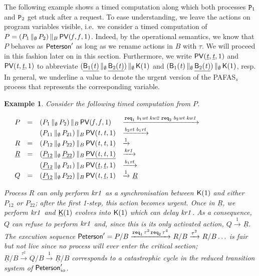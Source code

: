 \documentclass[copyright,creativecommons]{eptcs}
\newenvironment{tracex}{\ccspace{0.15}\noindent}{\ccspace{0.2}}
\newcommand{\ccspace}[1]{\vspace{#1cm}}
\newtheorem{example}[theorem]{Example}
\newcommand{\nar}[2]{\xrightarrow{#1}_{#2}}
\newcommand{\sar}[1]{\nar{#1}{}}
\newcommand{\fa}{\mathit{f}}
\newcommand{\tr}{\mathit{t}}
\newcommand{\Bv}{{\sf B}}
\newcommand{\rtb}[1]{{\it b_{{\rm #1}}rt}}
\newcommand{\wtb}[1]{{\it b_{{\rm #1}}wt}}
\newcommand{\Kv}{{\sf K}}
\newcommand{\rk}[1]{{\it kr #1}}
\newcommand{\wk}[1]{{\it kw #1}}
\newcommand{\vp}{{\sf PV}}
\newcommand{\req}{{\tt req}}
\newcommand{\petersona}{{\sf Peterson}} \newcommand{\petersonb}{\petersona}
\newcommand{\proc}{{\tt P}}
\newcommand{\ppath}[5]{#1 & #2 & #3 & #4 & #5}
\begin{document}
The following example shows a timed computation along which both processes
$\proc_1$ and $\proc_2$ get stuck after a request. To ease understanding,
we leave the actions on program variables visible, i.e.\ we consider a
timed computation of $P = (P_1 \,\|_{\emptyset}\, P_2)
\,\|_B\,\vp(\fa,\fa,1)$. Indeed, by the operational semantics, we know that
$P$ behaves as $\petersona'$ as long as we rename actions in $B$ with
$\tau$. We will proceed in this fashion later on in this section.
Furthermore, we write $\vp(\underline{\tr},\underline{\tr}, 1)$ and
$\vp(\tr,\underline{\tr}, 1)$ to abbreviate $(\underline{\Bv_1 (\tr)}
\,\|_{\emptyset} \, \underline{\Bv_2(\tr)} ) \,\|_{\emptyset} \, \Kv(1)$
and $(\Bv_1 (\tr) \,\|_{\emptyset} \,\underline{\Bv_2(\tr)} )
\,\|_{\emptyset} \, \Kv(1)$, resp. In general, we underline a value to
denote the urgent version of the PAFAS$_s$ process that represents the
corresponding variable. 
\begin{example}\rm\label{ex:pet-1}
Consider the following timed computation from $P$.

\begin{tracex}
$\begin{array}{l c c l l}
\ppath{}{P}{=}{(P_1 \,\|_{\emptyset}\, P_2) \,\|_B\, \vp(\fa,\fa,1)} 
{\nar{\req_1 \; \wtb{1} \;  \wk{2} \; \req_2  \; \wtb{2} \; \wk{1} }{} }
{}\\
\ppath{}{}{}{(P_{11} \,\|_{\emptyset}\, P_{21}) \,\|_B\, \vp(\tr,\tr,1)}{
\nar{\rtb{2} \; \rtb{1}}{} }{}\\
\ppath{}{R}{ = }{(P_{12} \,\|_{\emptyset}\, P_{22}) \,\|_B\,
\vp(\tr,\tr,1)}{ \sar{1} }{}\\
\ppath{}{\underline{R}}{=}{(\underline{P_{12}} \,\|_{\emptyset}\,
\underline{P_{22}}) \,\|_B\, \underline{\vp(\tr,\tr,1)}}{ \nar{\rk{1}}{}
}{}\\
\ppath{}{}{}{(\underline{P_{12}} \,\|_{\emptyset}\, P_{21})
\,\|_B\, \vp(\underline{\tr},\underline{\tr},1)}{ \nar{\rtb{1}}{} }{}\\
\ppath{}{Q}{ = }{(\underline{P_{12}} \,\|_{\emptyset}\, P_{22})
\,\|_B\, \vp(\tr,\underline{\tr},1)} { \sar{1} {}}  {\underline{R}}\\
\end{array}$
\end{tracex}

\noindent Process $R$ can only perform $\rk{1}$ as a synchronisation
between $\Kv(1)$ and either $P_{12}$ or $P_{22}$; after the first  1-step,
this action becomes urgent. Once in $\underline{R}$, we perform $\rk{1}$
and $\underline{\Kv}(1)$ evolves into $\Kv(1)$ which can delay  $\rk{1}$.
As a consequence, $Q$ can refuse to perform $\rk{1}$ and, since this is its
only activated action, $Q \nar{1}{} \underline{R}$. The execution sequence
$\petersona' = P/B \nar{\req_1 \,\tau^2 \, \req_2 \, \tau^4}{} R/B 
\nar{\tau^2 }{} R /B \ldots$ is fair but not live since no process will
ever enter the critical section; $\underline{R}/B \nar{\tau^2 }{} Q/B
\nar{1}{} \underline{R}/B$ corresponds to a catastrophic cycle in the
reduced transition system of $\petersona'_{io}$. 
\end{example}
\end{document}
